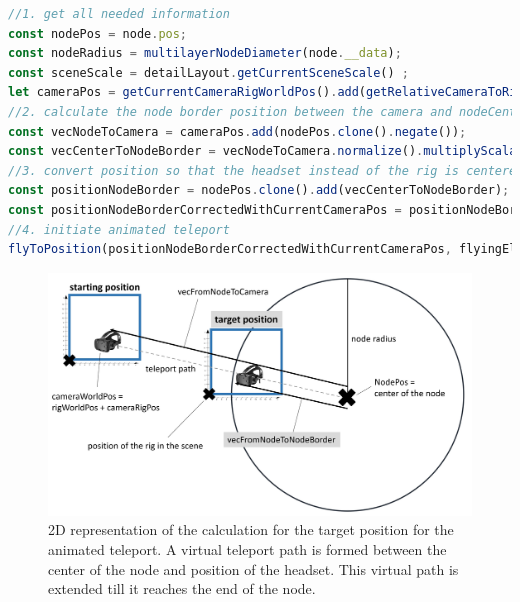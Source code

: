 \begin{lstlisting}[language=JavaScript,label={lst:calculationFlyToNode},caption=Matrix calculations for determining the target position of the animated teleport.]
//1. get all needed information
const nodePos = node.pos;
const nodeRadius = multilayerNodeDiameter(node.__data);
const sceneScale = detailLayout.getCurrentSceneScale() ;
let cameraPos = getCurrentCameraRigWorldPos().add(getRelativeCameraToRigPos());
//2. calculate the node border position between the camera and nodeCenter
const vecNodeToCamera = cameraPos.add(nodePos.clone().negate());
const vecCenterToNodeBorder = vecNodeToCamera.normalize().multiplyScalar(nodeRadius*0.95*sceneScale);//*0.95 as we want to be slightly inside the selected node
//3. convert position so that the headset instead of the rig is centered
const positionNodeBorder = nodePos.clone().add(vecCenterToNodeBorder);
const positionNodeBorderCorrectedWithCurrentCameraPos = positionNodeBorder.clone().add(getRelativeCameraToRigPos().negate());
//4. initiate animated teleport
flyToPosition(positionNodeBorderCorrectedWithCurrentCameraPos, flyingElement);
\end{lstlisting}
\begin{figure}[h]
    \centering
    \includegraphics[width=1\textwidth]{graphics/flyToNodePositionCalc.jpg}
    \caption{2D representation of the calculation for the target position for the animated teleport. A virtual teleport path is formed between the center of the node and position of the headset. This virtual path is extended till it reaches the end of the node.} 
    \label{fig:vrFlyToNode} 
\end{figure}

